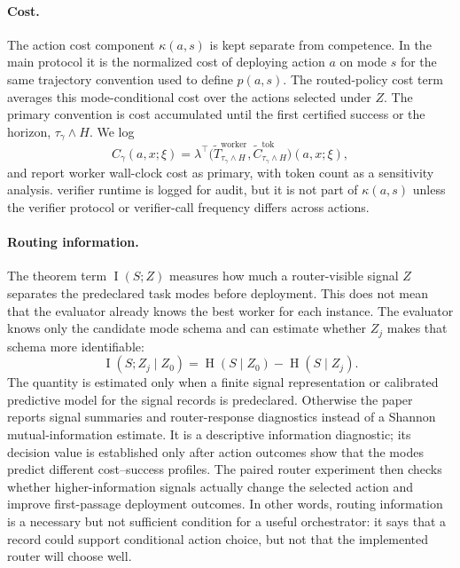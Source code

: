 \documentclass{article}
\DeclareMathOperator{\MI}{I}
\DeclareMathOperator{\Hent}{H}
\begin{document}
\paragraph{Cost.}
The action cost component $\kappa(a,s)$ is kept separate from competence.
In the main protocol it is the normalized cost of deploying action $a$ on mode $s$ for the same trajectory convention used to define $p(a,s)$.
The routed-policy cost term averages this mode-conditional cost over the actions selected under $Z$.
The primary convention is cost accumulated until the first certified success or the horizon, \(\tau_\gamma\wedge H\).
We log
\[
C_\gamma(a,x;\xi)
=
\lambda^\top
\bigl(
\widetilde T^{\mathrm{worker}}_{\tau_\gamma\wedge H},
\widetilde C^{\mathrm{tok}}_{\tau_\gamma\wedge H}
\bigr)(a,x;\xi),
\]
and report worker wall-clock cost as primary, with token count as a sensitivity analysis.
verifier runtime is logged for audit, but it is not part of $\kappa(a,s)$ unless the verifier protocol or verifier-call frequency differs across actions.

\paragraph{Routing information.}
The theorem term $\MI(S;Z)$ measures how much a router-visible signal $Z$ separates the predeclared task modes before deployment.
This does not mean that the evaluator already knows the best worker for each instance.
The evaluator knows only the candidate mode schema and can estimate whether $Z_j$ makes that schema more identifiable:
\[
\MI(S;Z_j\mid Z_0)=\Hent(S\mid Z_0)-\Hent(S\mid Z_j).
\]
The quantity is estimated only when a finite signal representation or calibrated predictive model for the signal records is predeclared.
Otherwise the paper reports signal summaries and router-response diagnostics instead of a Shannon mutual-information estimate.
It is a descriptive information diagnostic; its decision value is established only after action outcomes show that the modes predict different cost--success profiles.
The paired router experiment then checks whether higher-information signals actually change the selected action and improve first-passage deployment outcomes.
In other words, routing information is a necessary but not sufficient condition for a useful orchestrator: it says that a record could support conditional action choice, but not that the implemented router will choose well.
\end{document}
